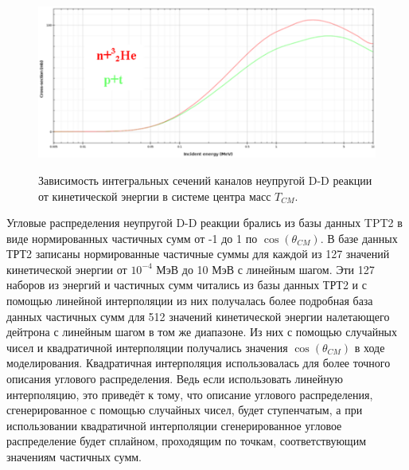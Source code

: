 \documentclass[a4paper,12pt]{article}
\begin{document}
\begin{large}
\begin{figure}[ht]
  {
     \includegraphics[width=0.99\linewidth]{images/DDInelasticIntegralCrossSections.pdf}
  }
  \caption{Зависимость интегральных сечений каналов неупругой D-D реакции от кинетической энергии в системе центра масс $T_{CM}$.}
  \label{fig:InelasticDDIntegralCrossSections}
\end{figure}	
	
	
	Угловые распределения неупругой D-D реакции брались из базы данных TPT2 в виде нормированных частичных сумм от -1 до 1 по $\cos{ \left( \theta_{CM} \right) }$. В базе данных ТРТ2 записаны нормированные частичные суммы для каждой из 127 значений кинетической энергии от $10^{-4}$ МэВ до 10 МэВ с линейным шагом. Эти 127 наборов из энергий и частичных сумм читались из базы данных ТРТ2 и с помощью линейной интерполяции из них получалась более подробная база данных частичных сумм для 512 значений кинетической энергии налетающего дейтрона с линейным шагом в том же диапазоне. Из них с помощью случайных чисел и квадратичной интерполяции получались значения $\cos{ \left( \theta_{CM} \right) }$ в ходе моделирования. Квадратичная интерполяция использовалась для более точного описания углового распределения. Ведь если использовать линейную интерполяцию, это приведёт к тому, что описание углового распределения, сгенерированное с помощью случайных чисел, будет ступенчатым, а при использовании квадратичной интерполяции сгенерированное угловое распределение будет сплайном, проходящим по точкам, соответствующим значениям частичных сумм.
	

\end{large}
\end{document}
